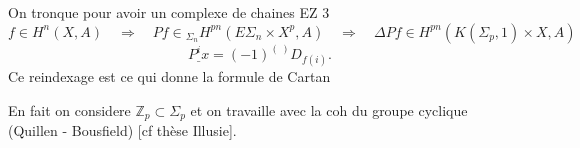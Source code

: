 On tronque pour avoir un complexe de chaines
\hfill EZ 3
\[
f\in H^n(X,A)\quad\Longrightarrow\quad Pf\in{}_{\Sigma_n}H^{pn}(E\Sigma_n\times X^p,A)
\quad\Longrightarrow\quad\Delta Pf\in H^{pn}(K(\Sigma_p,1)\times X,A)
\]
\[
\underline{P^i x}=(-1)^{(\ )}D_{f(i)}.
\]
Ce reindexage est ce qui donne la formule de Cartan

En fait on considere $\mathbb Z_p\subset\Sigma_p$ et on travaille avec la coh du groupe cyclique
 (Quillen - Bousfield) [cf thèse Illusie].

